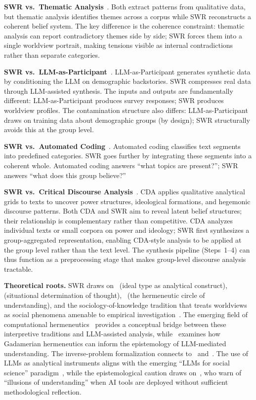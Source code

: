 \documentclass[11pt,a4paper]{article}
\begin{document}
\textbf{SWR vs.\ Thematic Analysis}~\citep{Braun2006}. Both extract patterns from qualitative data, but thematic analysis identifies themes across a corpus while SWR reconstructs a coherent belief system. The key difference is the coherence constraint: thematic analysis can report contradictory themes side by side; SWR forces them into a single worldview portrait, making tensions visible as internal contradictions rather than separate categories.

\textbf{SWR vs.\ LLM-as-Participant}~\citep{Argyle2023}. LLM-as-Participant generates synthetic data by conditioning the LLM on demographic backstories. SWR compresses real data through LLM-assisted synthesis. The inputs and outputs are fundamentally different: LLM-as-Participant produces survey responses; SWR produces worldview profiles. The contamination structure also differs: LLM-as-Participant draws on training data about demographic groups (by design); SWR structurally avoids this at the group level.

\textbf{SWR vs.\ Automated Coding}~\citep{Tai2024}. Automated coding classifies text segments into predefined categories. SWR goes further by integrating these segments into a coherent whole. Automated coding answers ``what topics are present?''; SWR answers ``what does this group believe?''

\textbf{SWR vs.\ Critical Discourse Analysis}~\citep[CDA;][]{Fairclough1992, Wodak2001}. CDA applies qualitative analytical grids to texts to uncover power structures, ideological formations, and hegemonic discourse patterns. Both CDA and SWR aim to reveal latent belief structures; their relationship is complementary rather than competitive. CDA analyzes individual texts or small corpora on power and ideology; SWR first synthesizes a group-aggregated representation, enabling CDA-style analysis to be applied at the group level rather than the text level. The synthesis pipeline (Steps~1--4) can thus function as a preprocessing stage that makes group-level discourse analysis tractable.

\textbf{Theoretical roots.} SWR draws on~\citet{Weber1904} (ideal type as analytical construct),~\citet{Mannheim1929} (situational determination of thought),~\citet{Gadamer1960} (the hermeneutic circle of understanding), and the sociology-of-knowledge tradition that treats worldviews as social phenomena amenable to empirical investigation~\citep{BergerLuckmann1966}. The emerging field of computational hermeneutics~\citep{Kommers2026} provides a conceptual bridge between these interpretive traditions and LLM-assisted analysis, while~\citet{Hornby2024} examines how Gadamerian hermeneutics can inform the epistemology of LLM-mediated understanding. The inverse-problem formalization connects to~\citet{Tarantola2005} and~\citet{Hadamard1923}. The use of LLMs as analytical instruments aligns with the emerging ``LLMs for social science'' paradigm~\citep{Ziems2024, Bail2024}, while the epistemological caution draws on~\citet{Messeri2024}, who warn of ``illusions of understanding'' when AI tools are deployed without sufficient methodological reflection.
\end{document}
